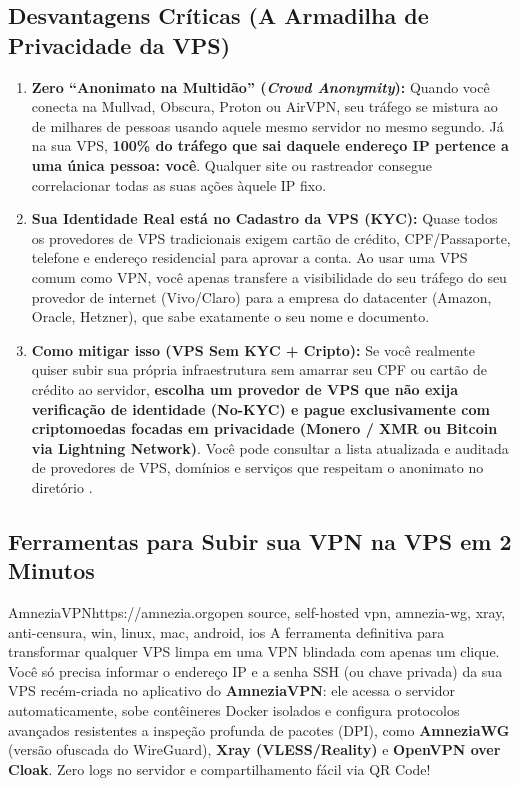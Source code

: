 \documentclass{pousadaguide}
\begin{document}
\subsection{Desvantagens Críticas (A Armadilha de Privacidade da VPS)}

\begin{perigo}
\begin{enumerate}
  \item \textbf{Zero ``Anonimato na Multidão'' (\emph{Crowd Anonymity}):} Quando você conecta na Mullvad, Obscura, Proton ou AirVPN, seu tráfego se mistura ao de milhares de pessoas usando aquele mesmo servidor no mesmo segundo. Já na sua VPS, \textbf{100\% do tráfego que sai daquele endereço IP pertence a uma única pessoa: você}. Qualquer site ou rastreador consegue correlacionar todas as suas ações àquele IP fixo.
  \item \textbf{Sua Identidade Real está no Cadastro da VPS (KYC):} Quase todos os provedores de VPS tradicionais exigem cartão de crédito, CPF/Passaporte, telefone e endereço residencial para aprovar a conta. Ao usar uma VPS comum como VPN, você apenas transfere a visibilidade do seu tráfego do seu provedor de internet (Vivo/Claro) para a empresa do datacenter (Amazon, Oracle, Hetzner), que sabe exatamente o seu nome e documento.
  \item \textbf{Como mitigar isso (VPS Sem KYC + Cripto):} Se você realmente quiser subir sua própria infraestrutura sem amarrar seu CPF ou cartão de crédito ao servidor, \textbf{escolha um provedor de VPS que não exija verificação de identidade (No-KYC) e pague exclusivamente com criptomoedas focadas em privacidade (Monero / XMR ou Bitcoin via Lightning Network)}. Você pode consultar a lista atualizada e auditada de provedores de VPS, domínios e serviços que respeitam o anonimato no diretório .
\end{enumerate}
\end{perigo}

\subsection{Ferramentas para Subir sua VPN na VPS em 2 Minutos}

\begin{ferramenta}[goat,logo=amnezia]{AmneziaVPN}{https://amnezia.org}{open source, self-hosted vpn, amnezia-wg, xray, anti-censura, win, linux, mac, android, ios}
A ferramenta definitiva para transformar qualquer VPS limpa em uma VPN blindada com apenas um clique. Você só precisa informar o endereço IP e a senha SSH (ou chave privada) da sua VPS recém-criada no aplicativo do \textbf{AmneziaVPN}: ele acessa o servidor automaticamente, sobe contêineres Docker isolados e configura protocolos avançados resistentes a inspeção profunda de pacotes (DPI), como \textbf{AmneziaWG} (versão ofuscada do WireGuard), \textbf{Xray (VLESS/Reality)} e \textbf{OpenVPN over Cloak}. Zero logs no servidor e compartilhamento fácil via QR Code! 
\end{ferramenta}
\end{document}
